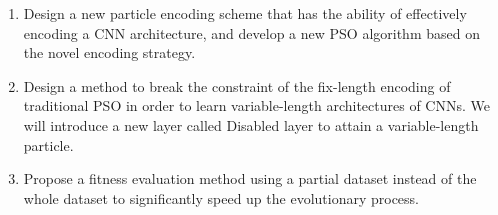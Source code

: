 \documentclass[conference]{IEEEtran}
\begin{document}
\begin{enumerate}
	\item Design a new particle encoding scheme that has the ability of effectively encoding a CNN architecture, and develop a new PSO algorithm based on the novel encoding strategy.
	\item Design a method to break the constraint of the fix-length encoding of traditional PSO in order to learn variable-length architectures of CNNs. We will introduce a new layer called Disabled layer to attain a variable-length particle.
	\item Propose a fitness evaluation method using a partial dataset instead of the whole dataset to significantly speed up the evolutionary process.
\end{enumerate}

\end{document}
